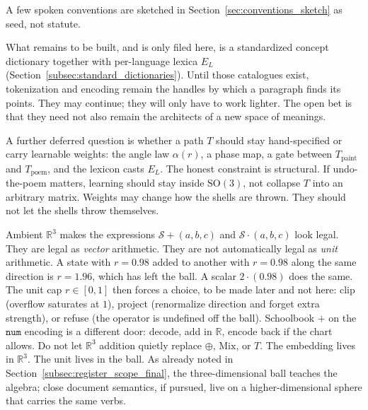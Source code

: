 \documentclass[12pt, a4paper]{article}
\begin{document}
A few spoken conventions are sketched in
Section~\ref{sec:conventions_sketch} as seed, not statute.

What remains to be built, and is only filed here, is a standardized
concept dictionary together with per-language lexica $E_L$
(Section~\ref{subsec:standard_dictionaries}). Until those catalogues
exist, tokenization and encoding remain the handles by which a
paragraph finds its points. They may continue; they will only have to
work lighter. The open bet is that they need not also
remain the architects of a new space of meanings.

A further deferred question is whether a path $T$ should stay
hand-specified or carry learnable weights: the angle law
$\alpha(r)$, a phase map, a gate between $T_{\mathrm{paint}}$ and
$T_{\mathrm{poem}}$, and the lexicon casts $E_L$. The honest
constraint is structural. If undo-the-poem matters, learning should
stay inside $\mathrm{SO}(3)$, not collapse $T$ into an arbitrary
matrix. Weights may change how the shells are thrown. They should
not let the shells throw themselves.

Ambient $\mathbb{R}^3$ makes the expressions
$\mathcal{S}+(a,b,c)$ and $\mathcal{S}\cdot(a,b,c)$ look legal.
They are legal as \emph{vector} arithmetic. They are not automatically
legal as \emph{unit} arithmetic. A state with $r=0.98$ added to
another with $r=0.98$ along the same direction is $r=1.96$, which
has left the ball. A scalar $2\cdot(0.98)$ does the same. The unit
cap $r\in[0,1]$ then forces a choice, to be made later and not
here: clip (overflow saturates at $1$), project (renormalize
direction and forget extra strength), or refuse (the operator is
undefined off the ball). Schoolbook $+$ on the $\mathtt{num}$
encoding is a different door: decode, add in $\mathbb{R}$, encode
back if the chart allows. Do not let $\mathbb{R}^3$ addition
quietly replace $\oplus$, $\mathrm{Mix}$, or $T$. The embedding
lives in $\mathbb{R}^3$. The unit lives in the ball.
As already noted in Section~\ref{subsec:register_scope_final},
the three-dimensional ball teaches the algebra; close document
semantics, if pursued, live on a higher-dimensional sphere that
carries the same verbs.
\end{document}
